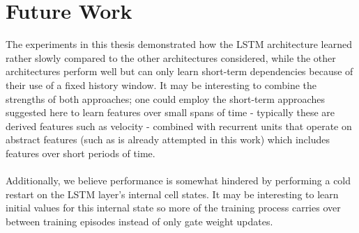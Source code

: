 \section{Future Work}
\label{sec:future_work}
The experiments in this thesis
demonstrated how the LSTM architecture learned rather slowly
compared to the other architectures considered,
while the other architectures perform well
but can only learn short-term dependencies
because of their use of a fixed history window.
It may be interesting to combine the strengths of both approaches;
one could employ the short-term approaches suggested here
to learn features over small spans of time
- typically these are derived features such as velocity -
combined with recurrent units that operate
on abstract features
(such as is already attempted in this work)
which includes features over short periods of time.

\paragraph{}
Additionally,
we believe performance is somewhat hindered
by performing a cold restart on the LSTM layer's
internal cell states.
It may be interesting to learn initial values
for this internal state
so more of the training process carries over
between training episodes
instead of only gate weight updates.
